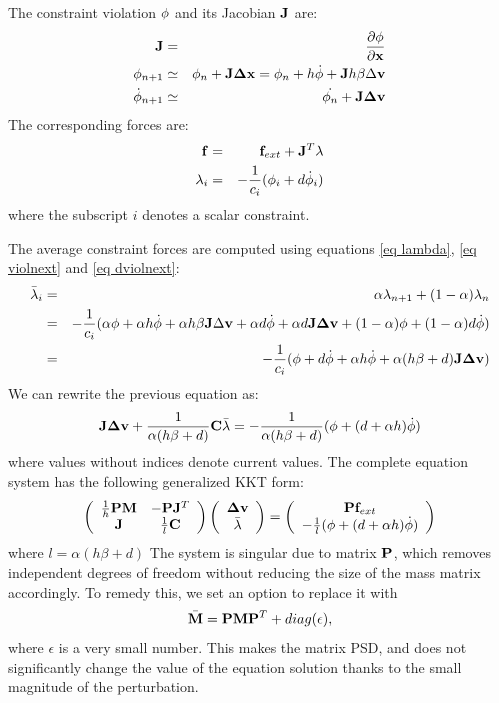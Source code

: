 The constraint violation $\violation$ and its Jacobian $\J$ are:
\begin{eqnarray}
 \J &=& \frac{\partial \vect \violation}{\partial \pos} \\
 \violnext &\simeq& \violcur + \J \dx = \violcur + h   \dviolation + \J h \beta \Delta \vel  \label{eq violnext}\\
\dviolnext &\simeq& \dviolcur + \J \dv \label{eq dviolnext}
\end{eqnarray}
The corresponding forces are:
\begin{eqnarray}
 \force &=& \forcext + \Jt \lam \\
 \lam_i &=& -\frac{1}{c_i} (  \violation_i + d \dviolation_i ) \label{eq lambda}
\end{eqnarray}
where the subscript $i$ denotes a scalar constraint.

The average constraint forces are computed  using equations \ref{eq lambda}, \ref{eq violnext} and \ref{eq dviolnext}:
\begin{eqnarray*}
 \avlam_i &=& \alpha \lnext + (1-\alpha) \lcur \\
&=& -\frac{1}{c_i} ( \alpha \violation + \alpha h \dviolation  + \alpha h \beta \J \Delta \vel + \alpha d \dviolation + \alpha d \J \dv + (1-\alpha)\violation + (1-\alpha) d \dviolation  ) \\
&=& -\frac{1}{c_i} ( \violation + d\dviolation + \alpha h \dviolation + \alpha(h\beta+d)\J \dv )
\end{eqnarray*}
We can rewrite the previous equation as:
\begin{equation} \label{eq bottom}
 \J \dv + \frac{1}{\alpha(h\beta+d)}\C\avlam = - \frac{1}{\alpha(h\beta+d)} (\violation + (d+\alpha h)\dviolation)
\end{equation}
where values without indices denote current values.
The complete equation system has the following generalized KKT form:
\begin{equation}
 \left( \begin{array}{cc}
\frac{1}{h}\P\M & -\P\Jt \\
\J & \frac{1}{l} \C \end{array}\right)
\left( \begin{array}{c}
\dv \\ \avlam
\end{array}\right) = \left( \begin{array}{c}
\P\forcext  \\
- \frac{1}{l} (\violation +(d+\alpha h) \dviolation)
\end{array}\right) 
\end{equation}
where $ l=\alpha(h \beta + d) $
The system is singular due to matrix $\P $, which removes independent degrees of freedom without reducing the size of the mass matrix accordingly.
To remedy this, we set an option to replace it with 
\begin{equation} \label{eq mbar}
\bar\M = \P \M \P^T + diag(\epsilon),
\end{equation}
 where $\epsilon$ is a very small number. 
This makes the matrix PSD, and does not significantly change the value of the equation solution thanks to the small magnitude of the perturbation.

